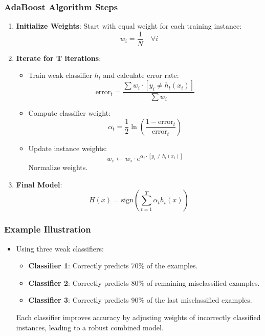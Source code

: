 \documentclass[aspectratio=169]{beamer}
\begin{document}
\begin{frame}[fragile]
  \frametitle{AdaBoost Algorithm Steps}
  \begin{enumerate}
    \item \textbf{Initialize Weights}: Start with equal weight for each training instance: 
      \[
      w_i = \frac{1}{N} \quad \forall i
      \]
      
    \item \textbf{Iterate for T iterations}:
      \begin{itemize}
        \item Train weak classifier $h_t$ and calculate error rate:
          \[
          \text{error}_t = \frac{\sum w_i \cdot [y_i \neq h_t(x_i)]}{\sum w_i}
          \]
        \item Compute classifier weight:
          \[
          \alpha_t = \frac{1}{2} \ln\left(\frac{1 - \text{error}_t}{\text{error}_t}\right)
          \]
        \item Update instance weights:
          \[
          w_i \leftarrow w_i \cdot e^{\alpha_t \cdot [y_i \neq h_t(x_i)]}
          \]
          Normalize weights.
      \end{itemize}
      
    \item \textbf{Final Model}: 
      \[
      H(x) = \text{sign}\left(\sum_{t=1}^{T} \alpha_t h_t(x)\right)
      \]
  \end{enumerate}
\end{frame}

\begin{frame}[fragile]
  \frametitle{Example Illustration}
  \begin{itemize}
    \item Using three weak classifiers:
      \begin{itemize}
        \item \textbf{Classifier 1}: Correctly predicts 70\% of the examples.
        \item \textbf{Classifier 2}: Correctly predicts 80\% of remaining misclassified examples.
        \item \textbf{Classifier 3}: Correctly predicts 90\% of the last misclassified examples.
      \end{itemize}
      Each classifier improves accuracy by adjusting weights of incorrectly classified instances, leading to a robust combined model.
  \end{itemize}
\end{frame}
\end{document}
